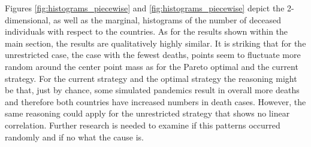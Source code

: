Figures \ref{fig:histograms_piecewise}  and \ref{fig:histograms_piecewise} depict the 2-dimensional, as well as the marginal, histograms of the number of deceased individuals with respect to the countries. As for the results shown within the main section, the results are qualitatively highly similar. It is striking that for the unrestricted case, the case with the fewest deaths, points seem to fluctuate more random around the center point mass as for the Pareto optimal and the current strategy. For the current strategy and the optimal strategy the reasoning might be that, just by chance, some simulated pandemics result in overall more deaths and therefore both countries have increased numbers in death cases. However, the same reasoning could apply for the unrestricted strategy that shows no linear correlation.
Further research is needed to examine if this patterns occurred randomly and if no what the cause is.
